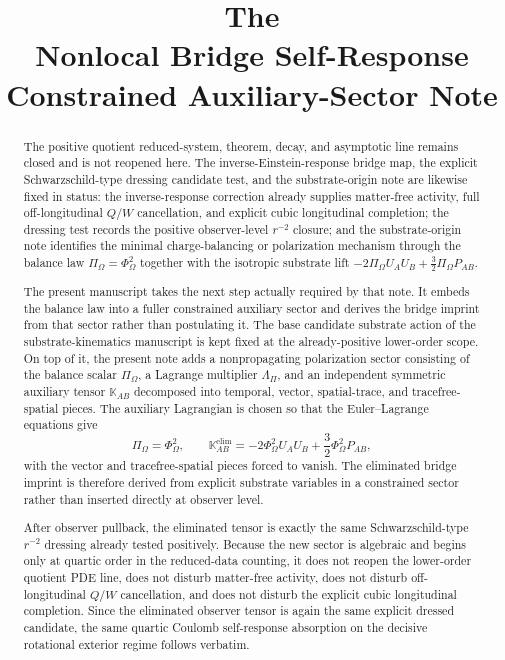 \documentclass[11pt]{article}
\title{\textbf{The \TheoryName{}}\\[0.4em]
\large Nonlocal Bridge Self-Response Constrained Auxiliary-Sector Note}
\author{}
\date{}
\newcommand{\ProjSub}{P}
\newcommand{\FlowPot}{\Phi_\Omega}
\newcommand{\BalanceField}{\Pi_\Omega}
\newcommand{\BalMult}{\Lambda_\Pi}
\newcommand{\AuxPol}{\mathbb K}
\begin{document}
\maketitle

\begin{abstract}
The positive quotient reduced-system, theorem, decay, and asymptotic line remains closed and is not reopened here. The inverse-Einstein-response bridge map, the explicit Schwarzschild-type dressing candidate test, and the substrate-origin note are likewise fixed in status: the inverse-response correction already supplies matter-free activity, full off-longitudinal \(Q/W\) cancellation, and explicit cubic longitudinal completion; the dressing test records the positive observer-level \(r^{-2}\) closure; and the substrate-origin note identifies the minimal charge-balancing or polarization mechanism through the balance law \(\BalanceField=\FlowPot^2\) together with the isotropic substrate lift \(-2\BalanceField U_AU_B+\tfrac32\BalanceField\ProjSub_{AB}\).

The present manuscript takes the next step actually required by that note. It embeds the balance law into a fuller constrained auxiliary sector and derives the bridge imprint from that sector rather than postulating it. The base candidate substrate action of the substrate-kinematics manuscript is kept fixed at the already-positive lower-order scope. On top of it, the present note adds a nonpropagating polarization sector consisting of the balance scalar \(\BalanceField\), a Lagrange multiplier \(\BalMult\), and an independent symmetric auxiliary tensor \(\AuxPol_{AB}\) decomposed into temporal, vector, spatial-trace, and tracefree-spatial pieces. The auxiliary Lagrangian is chosen so that the Euler--Lagrange equations give
\[
\BalanceField=\FlowPot^2,
\qquad
\AuxPol^{\mathrm{elim}}_{AB}
=
-2\FlowPot^2U_AU_B
+\frac32\FlowPot^2\ProjSub_{AB},
\]
with the vector and tracefree-spatial pieces forced to vanish. The eliminated bridge imprint is therefore derived from explicit substrate variables in a constrained sector rather than inserted directly at observer level.

After observer pullback, the eliminated tensor is exactly the same Schwarzschild-type \(r^{-2}\) dressing already tested positively. Because the new sector is algebraic and begins only at quartic order in the reduced-data counting, it does not reopen the lower-order quotient PDE line, does not disturb matter-free activity, does not disturb off-longitudinal \(Q/W\) cancellation, and does not disturb the explicit cubic longitudinal completion. Since the eliminated observer tensor is again the same explicit dressed candidate, the same quartic Coulomb self-response absorption on the decisive rotational exterior regime follows verbatim.


\end{abstract}
\end{document}
